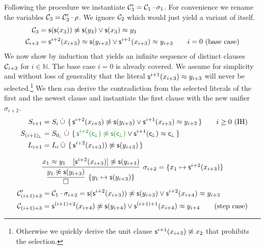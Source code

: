 \begin{example}
Following the procedure
we instantiate \( \mathcal{C}'_3 = \mathcal{C}_1\cdot\sigma_1 \).
For convenience we rename the variables \( \mathcal{C}_3 = \mathcal{C}_3'\cdot\rho \).
We ignore \( \mathcal{C}_2 \) which would just yield a variant of itself.
\begin{align*}
	\mathcal{C}_3 &= \mathsf{s}(\mathsf{s}(x_3)) \not\approx \mathsf{s}(y_3) \lor \mathsf{s}(x_3) \approx y_3
	\\
	\mathcal{C}_{i+3} &= \mathsf{s}^{i+2}(x_{i+3})\approx \mathsf{s}(y_{i+3}) \lor \mathsf{s}^{i+1}(x_{i+3})\approx y_{i+3}
	\tag*{\( i=0 \) (base case)}
	\end{align*}
	We now show by induction that \InstGenEQ{} yields an infinite sequence of distinct clauses \( \mathcal{C}_{i+3} \) for \( i\in\mathbb{N} \).
	The base case \( i=0 \) is already covered. We assume for simplicity and without loss of generality that the literal \( \mathsf{s}^{i+1}(x_{i+3})\approx y_{i+3} \) will never be selected.\footnote{
		Otherwise we quickly derive the unit clause \( \mathsf{s}^{i+1}(x_{i+3})\not\approx x_2 \) that prohibits the selection.}
	We then can derive the contradiction from the selected literals of the first and the newest clause
	and instantiate the first clause with the new unifier \( \sigma_{i+2} \).
	\begin{align*}
	S_{i+1} &= S_i\disjointunion \, \{ \,
	\msucc^{i+2}(x_{i+3}) \mNE \msucc(y_{i+3}) \lor \msucc^{i+1}(x_{i+3}) \mEQ y_{i+3} \,
	\}
	\tag*{\( i\geq 0 \) (IH)}
	\\
	S_{(i+1)\!_\bot} &= S_{0\!_\bot}\disjointunion \, \{ \,
	{\colHi\msucc^{i+2}(\consbot) \mNE \msucc(\consbot)} \lor {\msucc^{i+1}(\consbot) \mEQ \consbot} \,
	\}
	\\
	L_{i+1} &= L_i \disjointunion \, \{ \,
		\msucc^{i+2}(x_{i+3})) \mNE \msucc(y_{i+3})
	 \, \}
	\\[0.7em]
	&\infer[\sigma_{i+2} = \{ x_1\mapsto \msucc^{i+2}(x_{i+3})\}
	]{
		\infer[ \{ y_1\mapsto \msucc(y_{i+3})\}]{\emptyclause}{ y_1\mNE \msucc(y_{i+3}) }
	}
	{x_1 \mEQ y_1 & [\msucc^{i+2}(x_{i+3})]\mNE \msucc(y_{i+3})}
	\\
	\mcC'_{(i+1)+3} &= \mcC_1\cdot\sigma_{i+2} =
	\msucc(\msucc^{i+2}(x_{i+3})) \mNE \msucc(y_{i+3}) \lor \msucc^{i+2}(x_{i+4}) \mEQ y_{i+3}
	\\
	\mcC_{(i+1)+3} &=
	\msucc^{(i+1)+2}(x_{i+4}) \mNE \msucc(y_{i+4}) \lor \msucc^{(i+1)+1}(x_{i+4}) \mEQ y_{i+4}
	\tag{step case}
\end{align*}


\end{example}
